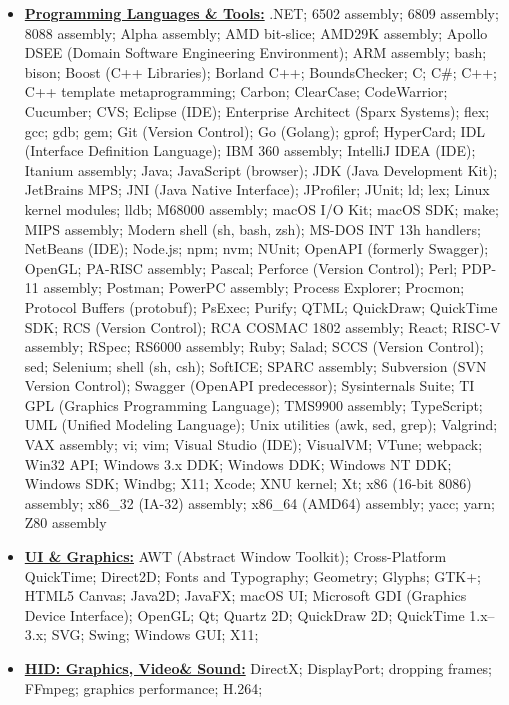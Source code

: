 \documentclass[letterpaper,11pt]{article}
\begin{document}
{\begin{itemize}[leftmargin=0.1in, label={}, itemsep=0pt, parsep=0pt, topsep=0pt, partopsep=0pt]
\item
\textbf{\underline{Programming Languages \& Tools:}}  \hspace{0pt}
.NET;
6502 assembly;
6809 assembly;
8088 assembly;
Alpha assembly;
AMD bit-slice;
AMD29K assembly;
Apollo DSEE (Domain Software Engineering Environment);
ARM assembly;
bash;
bison;
Boost (C++ Libraries);
Borland C++;
BoundsChecker;
C;
C\#;
C++;
C++ template metaprogramming;
Carbon;
ClearCase;
CodeWarrior;
Cucumber;
CVS;
Eclipse (IDE);
Enterprise Architect (Sparx Systems);
flex;
gcc;
gdb;
gem;
Git (Version Control);
Go (Golang);
gprof;
HyperCard;
IDL (Interface Definition Language);
IBM 360 assembly;
IntelliJ IDEA (IDE);
Itanium assembly;
Java;
JavaScript (browser);
JDK (Java Development Kit);
JetBrains MPS;
JNI (Java Native Interface);
JProfiler;
JUnit;
ld;
lex;
Linux kernel modules;
lldb;
M68000 assembly;
macOS I/O Kit;
macOS SDK;
make;
MIPS assembly;
Modern shell (sh, bash, zsh);
MS-DOS INT 13h handlers;
NetBeans (IDE);
Node.js;
npm;
nvm;
NUnit;
OpenAPI (formerly Swagger);
OpenGL;
PA-RISC assembly;
Pascal;
Perforce (Version Control);
Perl;
PDP-11 assembly;
Postman;
PowerPC assembly;
Process Explorer;
Procmon;
Protocol Buffers (protobuf);
PsExec;
Purify;
QTML;
QuickDraw;
QuickTime SDK;
RCS (Version Control);
RCA COSMAC 1802 assembly;
React;
RISC-V assembly;
RSpec;
RS6000 assembly;
Ruby;
Salad;
SCCS (Version Control);
sed;
Selenium;
shell (sh, csh);
SoftICE;
SPARC assembly;
Subversion (SVN Version Control);
Swagger (OpenAPI predecessor);
Sysinternals Suite;
TI GPL (Graphics Programming Language);
TMS9900 assembly;
TypeScript;
UML (Unified Modeling Language);
Unix utilities (awk, sed, grep);
Valgrind;
VAX assembly;
vi;
vim;
Visual Studio (IDE);
VisualVM;
VTune;
webpack;
Win32 API;
Windows 3.x DDK;
Windows DDK;
Windows NT DDK;
Windows SDK;
Windbg;
X11;
Xcode;
XNU kernel;
Xt;
x86 (16-bit 8086) assembly;
x86\_32 (IA-32) assembly;
x86\_64 (AMD64) assembly;
yacc;
yarn;
Z80 assembly
\item
\textbf{\underline{UI \& Graphics:}} \hspace{0pt}
AWT (Abstract Window Toolkit);
Cross-Platform QuickTime;
Direct2D;
Fonts and Typography;
Geometry;
Glyphs;
GTK+;
HTML5 Canvas;
Java2D;
JavaFX;
macOS UI;
Microsoft GDI (Graphics Device Interface);
OpenGL;
Qt;
Quartz 2D;
QuickDraw 2D;
QuickTime 1.x--3.x;
SVG;
Swing;
Windows GUI;
X11;
\item
\textbf{\underline{HID: Graphics, Video\& Sound:}} \hspace{0pt}
DirectX;
DisplayPort;
dropping frames;
FFmpeg;
graphics performance;
H.264;

\end{itemize}}
\end{document}
